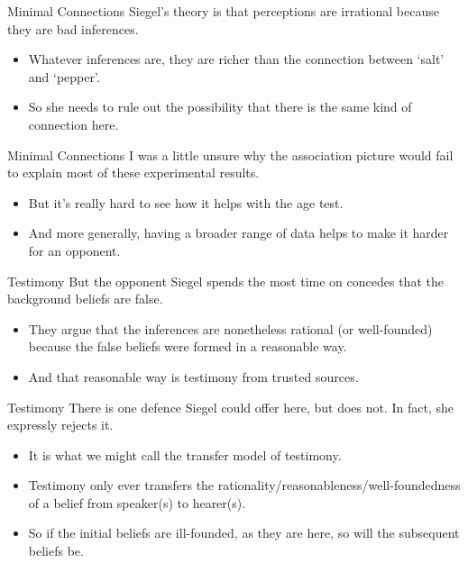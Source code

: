 \documentclass[
  17pt,
  letterpaper,
  ignorenonframetext,
  aspectratio=169,
  xcolor={dvipsnames}]{beamer}
\providecommand{\tightlist}{%
  \setlength{\itemsep}{0pt}\setlength{\parskip}{0pt}}\usepackage{longtable,booktabs,array}
\begin{document}
\begin{frame}{Minimal Connections}
\protect\hypertarget{minimal-connections-1}{}
Siegel's theory is that perceptions are irrational because they are bad
inferences.

\begin{itemize}[<+->]
\tightlist
\item
  Whatever inferences are, they are richer than the connection between
  `salt' and `pepper'.
\item
  So she needs to rule out the possibility that there is the same kind
  of connection here.
\end{itemize}
\end{frame}

\begin{frame}{Minimal Connections}
\protect\hypertarget{minimal-connections-2}{}
I was a little unsure why the association picture would fail to explain
most of these experimental results.

\begin{itemize}[<+->]
\tightlist
\item
  But it's really hard to see how it helps with the age test.
\item
  And more generally, having a broader range of data helps to make it
  harder for an opponent.
\end{itemize}
\end{frame}

\begin{frame}{Testimony}
\protect\hypertarget{testimony}{}
But the opponent Siegel spends the most time on concedes that the
background beliefs are false.

\begin{itemize}[<+->]
\tightlist
\item
  They argue that the inferences are nonetheless rational (or
  well-founded) because the false beliefs were formed in a reasonable
  way.
\item
  And that reasonable way is testimony from trusted sources.
\end{itemize}
\end{frame}

\begin{frame}{Testimony}
\protect\hypertarget{testimony-1}{}
There is one defence Siegel could offer here, but does not. In fact, she
expressly rejects it.

\begin{itemize}[<+->]
\tightlist
\item
  It is what we might call the transfer model of testimony.
\item
  Testimony only ever transfers the
  rationality/reasonableness/well-foundedness of a belief from
  speaker(s) to hearer(s).
\item
  So if the initial beliefs are ill-founded, as they are here, so will
  the subsequent beliefs be.
\end{itemize}
\end{frame}
\end{document}
